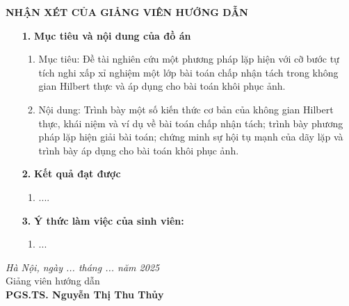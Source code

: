 \thisfancypage{
	\setlength{\fboxsep}{0.5cm}
	\fbox}{}
 
\fontsize{13pt}{16pt}\selectfont
\bigbreak
\begin{center}
	{\bf NHẬN XÉT CỦA GIẢNG VIÊN HƯỚNG DẪN}
\end{center}

\fontsize{12pt}{14pt}\selectfont
\begin{enumerate}
 \item [{\bf 1.}]{\bf Mục tiêu và nội dung của đồ án}
 \begin{enumerate}
 \item Mục tiêu: Đề tài nghiên cứu một phương pháp lặp hiện với cỡ bước tự tích nghi xấp xỉ nghiệm một lớp bài toán chấp nhận tách trong không gian Hilbert thực và áp dụng cho bài toán khôi phục ảnh.
 \item Nội dung: Trình bày một số kiến thức cơ bản của không gian Hilbert thực, khái niệm và ví dụ về bài toán chấp nhận tách; trình bày phương pháp lặp hiện giải bài toán; chứng minh sự hội tụ mạnh của dãy lặp và trình bày áp dụng cho bài toán khôi phục ảnh.
 \end{enumerate}
    
\item [{\bf 2.}] {\bf Kết quả đạt được} 
 \begin{enumerate}
\item ....
\end{enumerate}
\item [{\bf 3.}]{\bf Ý thức làm việc của sinh viên:}
\begin{enumerate}
\item ...
\end{enumerate}
\end{enumerate}

\vspace{5mm}
\hspace{0.5\textwidth}
\begin{minipage}{0.5\textwidth}
\noindent\begin{center}
\textit{Hà Nội, ngày ... tháng ...  năm 2025} \\
Giảng viên hướng dẫn\\ \vspace{0.6cm}
\vspace{1.5cm}
\textbf{PGS.TS. Nguyễn Thị Thu Thủy}
\end{center}	
\end{minipage}
\restoregeometry
